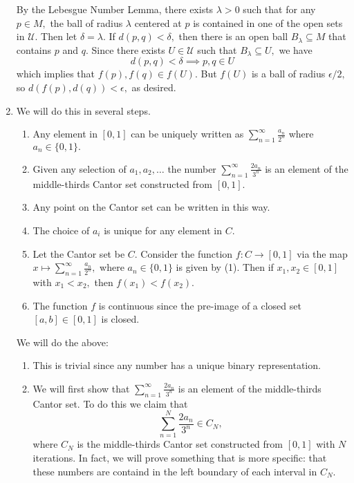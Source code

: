 \documentclass{article}
\numberwithin{equation}{section}
\begin{document}
\begin{enumerate}
    By the Lebesgue Number Lemma, there exists $\lambda > 0$ such that for any $p\in M,$ the ball of radius $\lambda$ centered at $p$ is contained in one of the open sets in $\mathcal{U}$. Then let $\delta = \lambda.$ If $d(p,q)<\delta,$ then there is an open ball $B_\lambda \subseteq M$ that contains $p$ and $q.$ Since there exists $U\in \mathcal{U}$ such that $B_\lambda \subseteq U,$ we have
    \begin{equation}
        d(p,q)<\delta \implies p,q \in U
    \end{equation}
    which implies that $f(p),f(q) \in f(U).$ But $f(U)$ is a ball of radius $\epsilon/2,$ so $d(f(p),d(q))<\epsilon,$ as desired.
    \newpage
    \item We will do this in several steps.
    \begin{enumerate}[label=(\arabic*)]
        \item Any element in $[0,1]$ can be uniquely written as $\sum_{n=1}^{\infty} \frac{a_n}{2^n}$ where $a_n \in \{0,1\}.$
        \item Given any selection of $a_1,a_2,\dots$ the number $\sum_{n=1}^{\infty} \frac{2a_n}{3^n}$ is an element of the middle-thirds Cantor set constructed from $[0,1].$
        \item Any point on the Cantor set can be written in this way.
        \item The choice of $a_i$ is unique for any element in $C.$
        \item Let the Cantor set be $C.$ Consider the function $f:C\to [0,1]$ via the map $x \mapsto \sum_{n=1}^{\infty}\frac{a_n}{2^n},$ where $a_n \in \{0,1\}$ is given by (1). Then if $x_1,x_2\in [0,1]$ with $x_1<x_2,$ then $f(x_1)< f(x_2).$ 
        \item The function $f$ is continuous since the pre-image of a closed set $[a,b]\in [0,1]$ is closed.
    \end{enumerate}
    We will do the above:
    \begin{enumerate}[label=Proof of (\arabic*)]
        \item This is trivial since any number has a unique binary representation.
        \item We will first show that $\sum_{n=1}^{\infty}\frac{2a_n}{3^n}$ is an element of the middle-thirds Cantor set. To do this we claim that 
        \begin{equation}
            \sum_{n=1}^{N} \frac{2a_n}{3^n} \in C_N,
        \end{equation}
        where $C_N$ is the middle-thirds Cantor set constructed from $[0,1]$ with $N$ iterations. In fact, we will prove something that is more specific: that these numbers are containd in the left boundary of each interval in $C_N.$
        

\end{enumerate}
\end{enumerate}
\end{document}
